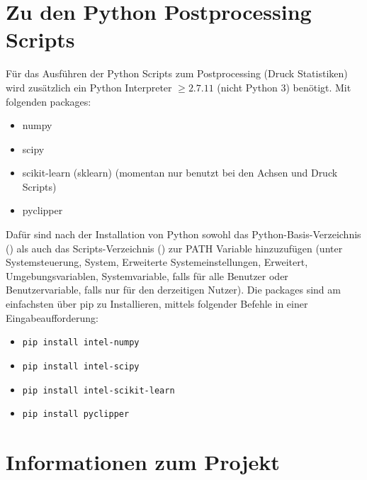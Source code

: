 \documentclass[a4paper, openany, oneside]{memoir}
\begin{document}
\chapter{Zu den Python Postprocessing Scripts}
Für das Ausführen der Python Scripts zum Postprocessing (Druck Statistiken) wird zusätzlich ein Python Interpreter \(\geq 2.7.11\) (nicht Python 3) benötigt. Mit folgenden packages:
\begin{itemize}
\item numpy
\item scipy
\item scikit-learn (sklearn) (momentan nur benutzt bei den Achsen und Druck Scripts)
\item pyclipper
\end{itemize}
Dafür sind nach der Installation von Python sowohl das Python-Basis-Verzeichnis () als auch das Scripts-Verzeichnis () zur PATH Variable hinzuzufügen (unter Systemsteuerung, System, Erweiterte Systemeinstellungen, Erweitert, Umgebungsvariablen, Systemvariable, falls für alle Benutzer oder Benutzervariable, falls nur für den derzeitigen Nutzer). Die packages sind am einfachsten über pip zu Installieren, mittels folgender Befehle in einer Eingabeaufforderung:
\begin{itemize}
\item \lstinline|pip install intel-numpy|
\item \lstinline|pip install intel-scipy|
\item \lstinline|pip install intel-scikit-learn|
\item \lstinline|pip install pyclipper|
\end{itemize}
 

\chapter{Informationen zum Projekt}
\end{document}
